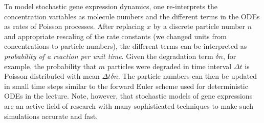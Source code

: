 To model stochastic gene expression dynamics, one re-interprets the concentration variables as molecule numbers and the different terms in the ODEs as rates of Poisson processes.
After replacing $x$ by a discrete particle number $n$ and appropriate rescaling of the rate constants (we changed units from concentrations to particle numbers), the different terms can be interpreted as \emph{probability of a reaction per unit time}.
Given the degradation term $\delta n$, for example, the probability that $m$ particles were degraded in time interval $\Delta t$ is Poisson distributed with mean $\Delta t \delta n$.
The particle numbers can then be updated in small time steps similar to the forward Euler scheme used for deterministic ODEs in the lecture.
Note, however, that stochastic models of gene expressions are an active field of research with many sophisticated techniques to make such simulations accurate and fast.

